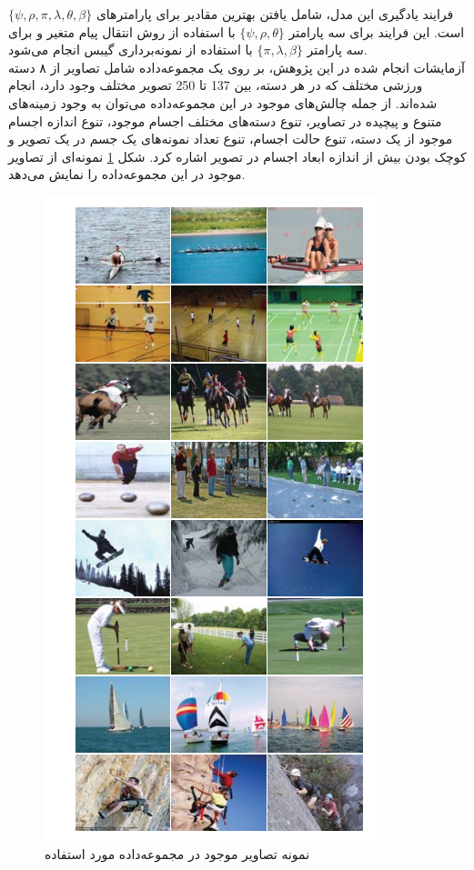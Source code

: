 \begin{enumerate}
فرایند یادگیری این مدل، شامل یافتن بهترین مقادیر برای پارامترهای 
$\{\psi,\rho,\pi,\lambda,\theta,\beta\}$
است.
این فرایند برای سه پارامتر 
$\{\psi,\rho,\theta\}$ 
با استفاده از روش انتقال پیام متغیر و برای سه پارامتر
$\{\pi,\lambda,\beta\}$
با استفاده از نمونه‌برداری گیبس انجام می‌شود.
\\
آزمایشات انجام شده در این پژوهش، بر روی یک مجموعه‌داده شامل تصاویر از ۸ دسته ورزشی مختلف که در هر دسته، بین 137 تا 250 تصویر مختلف وجود دارد، انجام شده‌اند. از جمله چالش‌های موجود در این مجموعه‌داده می‌توان به وجود زمینه‌های متنوع و پیچیده در تصاویر، تنوع دسته‌های مختلف اجسام موجود، تنوع اندازه اجسام موجود از یک دسته، تنوع حالت اجسام، تنوع تعداد نمونه‌های یک جسم در یک تصویر و کوچک بودن بیش از اندازه ابعاد اجسام در تصویر اشاره کرد. شکل
\ref{fig:lid}
نمونه‌ای از تصاویر موجود در این مجموعه‌داده را نمایش می‌دهد.

\begin{figure}[H]
\center
\includegraphics[scale=0.7]{./Imgs/li2007and_dataset.png}
\caption{نمونه تصاویر موجود در مجموعه‌داده مورد استفاده \cite{li2007and}}
\label{fig:lid}
\end{figure}


\end{enumerate}
